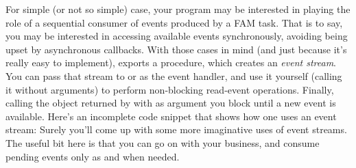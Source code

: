 For simple (or not so simple) case, your program may be interested in
playing the role of a sequential consumer of events produced by a FAM
task. That is to say, you may be interested in accessing available
events synchronously, avoiding being upset by asynchronous callbacks.
With those cases in mind (and just because it's really easy to
implement), 
exports a procedure,  which creates an
\textit{event stream}. You can pass that stream to
 or  as the event handler,
and use it yourself (calling it without arguments) to perform
non-blocking read-event operations. Finally, calling the object
returned by  with  as argument you
block until a new event is available. Here's an incomplete code
snippet that shows how one uses an event stream:
Surely you'll come up with some more imaginative uses of event
streams. The useful bit here is that you can go on with your business,
and consume pending events only as and when needed.

